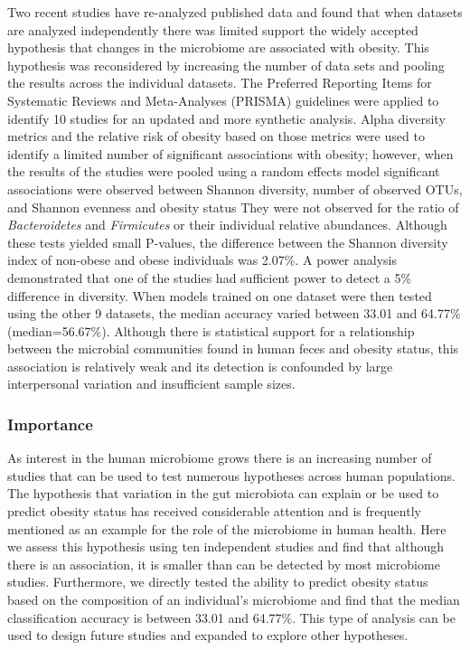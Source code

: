 \documentclass[12pt,]{article}
\begin{document}
Two recent studies have re-analyzed published data and found that when
datasets are analyzed independently there was limited support the widely
accepted hypothesis that changes in the microbiome are associated with
obesity. This hypothesis was reconsidered by increasing the number of
data sets and pooling the results across the individual datasets. The
Preferred Reporting Items for Systematic Reviews and Meta-Analyses
(PRISMA) guidelines were applied to identify 10 studies for an updated
and more synthetic analysis. Alpha diversity metrics and the relative
risk of obesity based on those metrics were used to identify a limited
number of significant associations with obesity; however, when the
results of the studies were pooled using a random effects model
significant associations were observed between Shannon diversity, number
of observed OTUs, and Shannon evenness and obesity status They were not
observed for the ratio of \emph{Bacteroidetes} and \emph{Firmicutes} or
their individual relative abundances. Although these tests yielded small
P-values, the difference between the Shannon diversity index of
non-obese and obese individuals was 2.07\%. A power analysis
demonstrated that one of the studies had sufficient power to detect a
5\% difference in diversity. When models trained on one dataset were
then tested using the other 9 datasets, the median accuracy varied
between 33.01 and 64.77\% (median=56.67\%). Although there is
statistical support for a relationship between the microbial communities
found in human feces and obesity status, this association is relatively
weak and its detection is confounded by large interpersonal variation
and insufficient sample sizes.

\subsubsection{Importance}\label{importance}

As interest in the human microbiome grows there is an increasing number
of studies that can be used to test numerous hypotheses across human
populations. The hypothesis that variation in the gut microbiota can
explain or be used to predict obesity status has received considerable
attention and is frequently mentioned as an example for the role of the
microbiome in human health. Here we assess this hypothesis using ten
independent studies and find that although there is an association, it
is smaller than can be detected by most microbiome studies. Furthermore,
we directly tested the ability to predict obesity status based on the
composition of an individual's microbiome and find that the median
classification accuracy is between 33.01 and 64.77\%. This type of
analysis can be used to design future studies and expanded to explore
other hypotheses.
\end{document}
